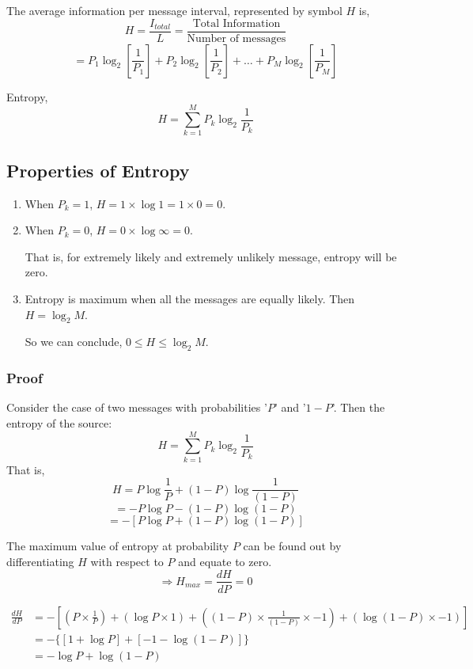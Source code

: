 \documentclass[12pt]{article}
\begin{document}
The average information per message interval, represented by symbol $H$ is,
$$H = \frac{I_{total}}{L} = \frac{\text{Total Information}}{\text{Number of messages}}$$
$$= P_1 \log_2 \left[ \frac{1}{P_1} \right] + P_2 \log_2 \left[ \frac{1}{P_2} \right] + \ldots + P_M \log_2 \left[ \frac{1}{P_M} \right]$$

Entropy,
$$H = \sum_{k=1}^{M} P_k \log_2 \frac{1}{P_k}$$

\subsection{Properties of Entropy}

\begin{enumerate}
	\item When $P_k=1$, $H = 1 \times \log 1 = 1 \times 0 = 0$.
	\item When $P_k=0$, $H = 0 \times \log \infty = 0$.

	      That is, for extremely likely and extremely unlikely message, entropy will be zero.

	\item Entropy is maximum when all the messages are equally likely. Then $H = \log_2 M$.

	      So we can conclude, $0 \le H \le \log_2 M$.
\end{enumerate}

\subsubsection*{Proof}
Consider the case of two messages with probabilities '$P$' and '$1-P$'. Then the entropy of the source:
$$H = \sum_{k=1}^{M} P_k \log_2 \frac{1}{P_k}$$
That is,
$$H = P \log \frac{1}{P} + (1-P) \log \frac{1}{(1-P)}$$
$$= -P \log P - (1-P) \log (1-P)$$
$$= -[P \log P + (1-P) \log (1-P)]$$

The maximum value of entropy at probability $P$ can be found out by differentiating $H$ with respect to $P$ and equate to zero.
$$\Rightarrow H_{max} = \frac{dH}{dP} = 0$$

\begin{align*}
	\frac{dH}{dP} & = - \left[ \left( P \times \frac{1}{P} \right) + (\log P \times 1) + \left( (1-P) \times \frac{1}{(1-P)} \times -1 \right) + (\log(1-P) \times -1) \right] \\
	              & = - \{ [1 + \log P] + [-1 - \log(1-P)] \}                                                                                                                  \\
	              & = - \log P + \log(1-P)
\end{align*}
\end{document}
